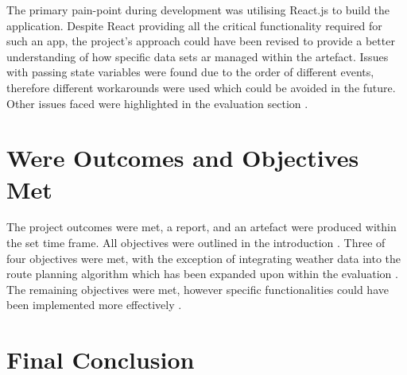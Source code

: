 The primary pain-point during development was utilising React.js to build the application. Despite React providing all the critical functionality required for such an app, the project's approach could have been revised to provide a better understanding of how specific data sets ar managed within the artefact. Issues with passing state variables were found due to the order of different events, therefore different workarounds were used which could be avoided in the future. Other issues faced were highlighted in the evaluation section .

\label{reflection-and-conclusion:outcomes/objectives-met}
\section{Were Outcomes and Objectives Met}

The project outcomes were met, a report, and an artefact were produced within the set time frame. All objectives were outlined in the introduction . Three of four objectives were met, with the exception of integrating weather data into the route planning algorithm which has been expanded upon within the evaluation . The remaining objectives were met, however specific functionalities could have been implemented more effectively .

\label{reflection-and-conclusion:final-conclusion}
\section{Final Conclusion}
